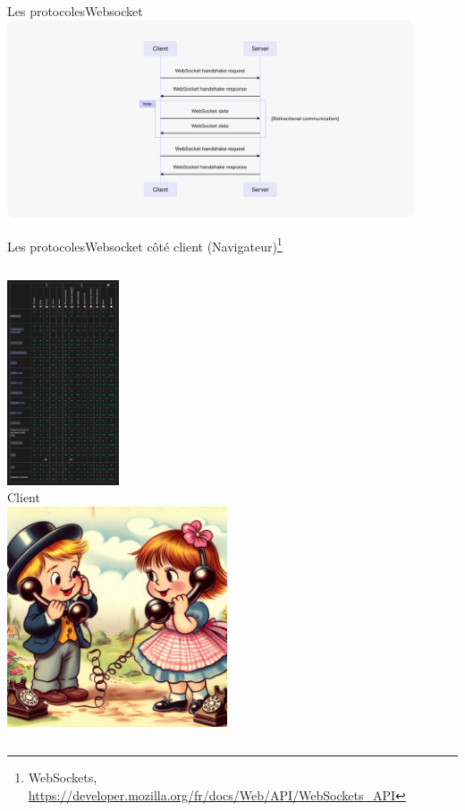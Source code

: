\documentclass{beamer}
\begin{document}
    \begin{frame}{Les protocoles}{Websocket\label{sendbird-protocole}}
        \centering
        \includegraphics[width=12cm]{image/tutorial-websocket-protocol-chart}
    \end{frame}

    \begin{frame}{Les protocoles}{Websocket côté client (Navigateur)\footnote{\label{mozilla-websocket}WebSockets, \url{https://developer.mozilla.org/fr/docs/Web/API/WebSockets_API}}}
        \begin{columns}
            \centering
            \includegraphics[width=3.3cm]{image/client-support} \\ Client \\
            \centering
            \includegraphics[width=6.5cm]{image/kids-on-the-phone}
        \end{columns}
    \end{frame}
\end{document}
